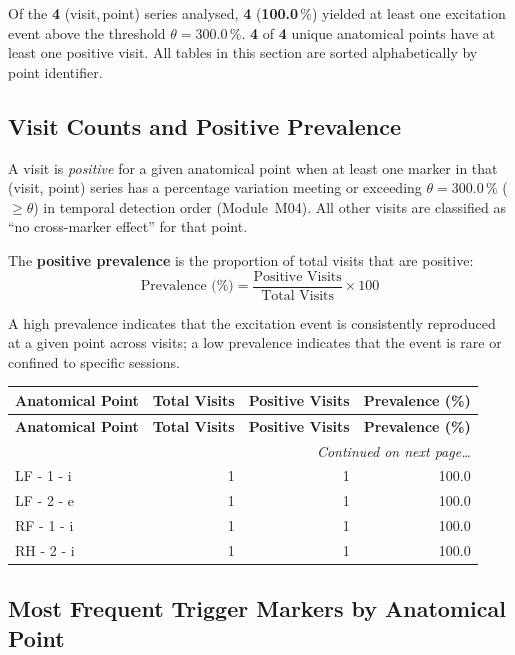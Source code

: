 \documentclass[a4paper,11pt]{article}
\begin{document}
\noindent
Of the \textbf{4} (visit,\,point) series analysed,
\textbf{4} (\textbf{100.0}\,\%) yielded at least one
excitation event above the threshold $\theta = 300.0\,\%$.
\textbf{4} of \textbf{4} unique anatomical points
have at least one positive visit.
All tables in this section are sorted alphabetically by point identifier.

\subsection{Visit Counts and Positive Prevalence}

A visit is \emph{positive} for a given anatomical point when at least one marker in that
(visit, point) series has a percentage variation meeting or exceeding
$\theta = 300.0\,\%$ ($\geq \theta$) in temporal detection order (Module~M04).
All other visits are classified as ``no cross-marker effect'' for that point.

The \textbf{positive prevalence} is the proportion of total visits that are positive:
\[
  \text{Prevalence (\%)} = \frac{\text{Positive Visits}}{\text{Total Visits}} \times 100
\]

A high prevalence indicates that the excitation event is consistently reproduced at a given
point across visits; a low prevalence indicates that the event is rare or confined to
specific sessions.

\begin{small}
\begin{longtable}{p{5cm}rrr}
\toprule
\textbf{Anatomical Point} &
\textbf{Total Visits} &
\textbf{Positive Visits} &
\textbf{Prevalence (\%)} \\
\midrule
\endfirsthead
\toprule
\textbf{Anatomical Point} &
\textbf{Total Visits} &
\textbf{Positive Visits} &
\textbf{Prevalence (\%)} \\
\midrule
\endhead
\midrule
\multicolumn{4}{r}{\small\emph{Continued on next page\ldots}} \\
\endfoot
\bottomrule
\endlastfoot
LF - 1 - i & 1 & 1 & 100.0 \\
LF - 2 - e & 1 & 1 & 100.0 \\
RF - 1 - i & 1 & 1 & 100.0 \\
RH - 2 - i & 1 & 1 & 100.0 \\
\end{longtable}
\end{small}

\subsection{Most Frequent Trigger Markers by Anatomical Point}
\end{document}
